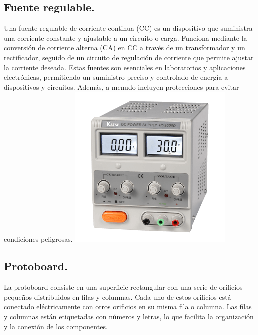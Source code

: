 \documentclass[10pt]{article}
\begin{document}
\begin{multicols}{2}
\subsection{Fuente regulable.}
Una fuente regulable de corriente continua (CC) es un dispositivo que suministra una corriente constante y ajustable a un circuito o carga. Funciona mediante la conversión de corriente alterna (CA) en CC a través de un transformador y un rectificador, seguido de un circuito de regulación de corriente que permite ajustar la corriente deseada. Estas fuentes son esenciales en laboratorios y aplicaciones electrónicas, permitiendo un suministro preciso y controlado de energía a dispositivos y circuitos. Además, a menudo incluyen protecciones para evitar condiciones peligrosas.
\includegraphics[width=\linewidth]{Imagenes/fuente.png}
\subsection{Protoboard.}
La protoboard consiste en una superficie rectangular con una serie de orificios pequeños distribuidos en filas y columnas. Cada uno de estos orificios está conectado eléctricamente con otros orificios en su misma fila o columna. Las filas y columnas están etiquetadas con números y letras, lo que facilita la organización y la conexión de los componentes.


\end{multicols}
\end{document}
